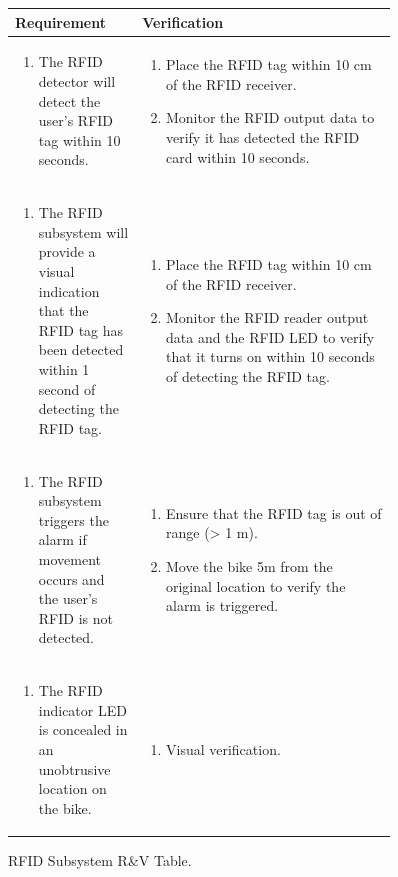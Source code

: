 \documentclass{article}
\begin{document}
\begin{figure}[H]
	\begin{center}
		\begin{tabular}{|p{0.3 \linewidth}|p{0.6 \linewidth}|}
			\hline
			Requirement & Verification  \\
			\hline
			\begin{enumerate}
				\item The RFID detector will detect the user’s RFID tag within 10 seconds. 
			\end{enumerate}  & \begin{enumerate} 
				\item Place the RFID tag within 10 cm of the RFID receiver. 
				\item Monitor the RFID output data to verify it has detected the RFID card within 10 seconds.
			\end{enumerate}
			\\
			\hline
			\begin{enumerate}
				\item The RFID subsystem will provide a visual indication that the RFID tag has been detected within 1 second of detecting the RFID tag. 
			\end{enumerate}  & \begin{enumerate}
				\item Place the RFID tag within 10 cm of the RFID receiver. 
				\item Monitor the RFID reader output data and the RFID LED to verify that it turns on within 10 seconds of detecting the RFID tag. 
			\end{enumerate} \\
			\hline
			\begin{enumerate}
				\item The RFID subsystem triggers the alarm if movement occurs and the user's RFID is not detected.
			\end{enumerate}  & \begin{enumerate}
				\item Ensure that the RFID tag is out of range (> 1 m).
				\item Move the bike 5m from the original location to verify the alarm is triggered.
			\end{enumerate} \\
			\hline
			\begin{enumerate}
				\item The RFID indicator LED is concealed in an unobtrusive location on the bike.
			\end{enumerate}  & \begin{enumerate}
				\item Visual verification.
			\end{enumerate} \\
			\hline
		\end{tabular}
	\end{center}
	\caption{RFID Subsystem R\&V Table.}
\end{figure}
\end{document}
